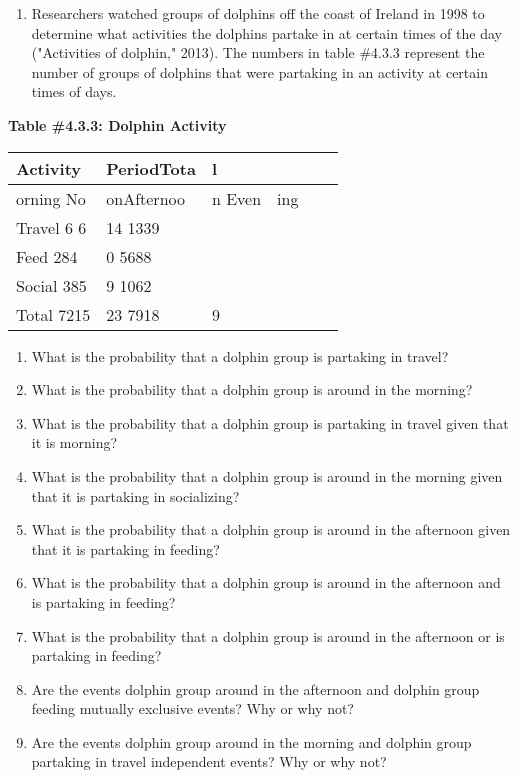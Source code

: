 \documentclass[]{book}
\providecommand{\tightlist}{%
  \setlength{\itemsep}{0pt}\setlength{\parskip}{0pt}}
\begin{document}
\begin{enumerate}
\def\labelenumi{\arabic{enumi}.}
\setcounter{enumi}{11}
\tightlist
\item
  Researchers watched groups of dolphins off the coast of Ireland in
  1998 to determine what activities the dolphins partake in at certain
  times of the day ("Activities of dolphin," 2013). The numbers in
  table \#4.3.3 represent the number of groups of dolphins that were
  partaking in an activity at certain times of days.
\end{enumerate}

\textbf{Table \#4.3.3: Dolphin Activity}

\begin{longtable}[]{@{}llllll@{}}
\toprule
Activity & PeriodTota & l & & &\tabularnewline
\midrule
\endhead
orning No & onAfternoo & n Even & ing & &\tabularnewline
Travel 6 6 & 14 1339 & & & &\tabularnewline
Feed 284 & 0 5688 & & & &\tabularnewline
Social 385 & 9 1062 & & & &\tabularnewline
Total 7215 & 23 7918 & 9 & & &\tabularnewline
\bottomrule
\end{longtable}

\begin{enumerate}
\def\labelenumi{\alph{enumi}.}
\item
  What is the probability that a dolphin group is partaking in travel?
\item
  What is the probability that a dolphin group is around in the
  morning?
\item
  What is the probability that a dolphin group is partaking in travel
  given that it is morning?
\item
  What is the probability that a dolphin group is around in the
  morning given that it is partaking in socializing?
\item
  What is the probability that a dolphin group is around in the
  afternoon given that it is partaking in feeding?
\item
  What is the probability that a dolphin group is around in the
  afternoon and is partaking in feeding?
\item
  What is the probability that a dolphin group is around in the
  afternoon or is partaking in feeding?
\item
  Are the events dolphin group around in the afternoon and dolphin
  group feeding mutually exclusive events? Why or why not?
\item
  Are the events dolphin group around in the morning and dolphin group
  partaking in travel independent events? Why or why not?
\end{enumerate}
\end{document}
